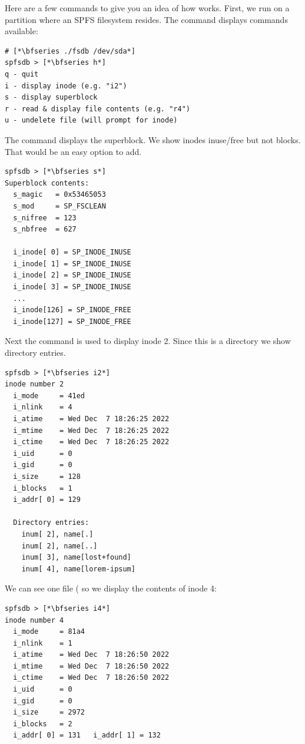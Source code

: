 Here are a few commands to give you an idea of how  works. First, we run  on a partition where an SPFS filesystem resides. The  command displays commands available:

\begin{lstlisting}
# [*\bfseries ./fsdb /dev/sda*]
spfsdb > [*\bfseries h*]
q - quit
i - display inode (e.g. "i2")
s - display superblock
r - read & display file contents (e.g. "r4")
u - undelete file (will prompt for inode)
\end{lstlisting}

\noindent
The  command displays the superblock. We show inodes inuse/free but not blocks. That would be an easy option to add.    

\begin{lstlisting}
spfsdb > [*\bfseries s*]
Superblock contents:
  s_magic   = 0x53465053
  s_mod     = SP_FSCLEAN
  s_nifree  = 123
  s_nbfree  = 627

  i_inode[ 0] = SP_INODE_INUSE
  i_inode[ 1] = SP_INODE_INUSE
  i_inode[ 2] = SP_INODE_INUSE
  i_inode[ 3] = SP_INODE_INUSE
  ...
  i_inode[126] = SP_INODE_FREE
  i_inode[127] = SP_INODE_FREE
\end{lstlisting}

\noindent
Next the  command is used to display inode 2. Since this is a directory we show directory entries.

\begin{lstlisting}
spfsdb > [*\bfseries i2*]
inode number 2
  i_mode     = 41ed
  i_nlink    = 4
  i_atime    = Wed Dec  7 18:26:25 2022
  i_mtime    = Wed Dec  7 18:26:25 2022
  i_ctime    = Wed Dec  7 18:26:25 2022
  i_uid      = 0
  i_gid      = 0
  i_size     = 128
  i_blocks   = 1
  i_addr[ 0] = 129 

  Directory entries:
	inum[ 2], name[.]
	inum[ 2], name[..]
	inum[ 3], name[lost+found]
	inum[ 4], name[lorem-ipsum]
\end{lstlisting}

\noindent
We can see one file ( so we display the contents of inode 4:   

\begin{lstlisting}
spfsdb > [*\bfseries i4*]
inode number 4
  i_mode     = 81a4
  i_nlink    = 1
  i_atime    = Wed Dec  7 18:26:50 2022
  i_mtime    = Wed Dec  7 18:26:50 2022
  i_ctime    = Wed Dec  7 18:26:50 2022
  i_uid      = 0
  i_gid      = 0
  i_size     = 2972
  i_blocks   = 2
  i_addr[ 0] = 131   i_addr[ 1] = 132 
\end{lstlisting}

